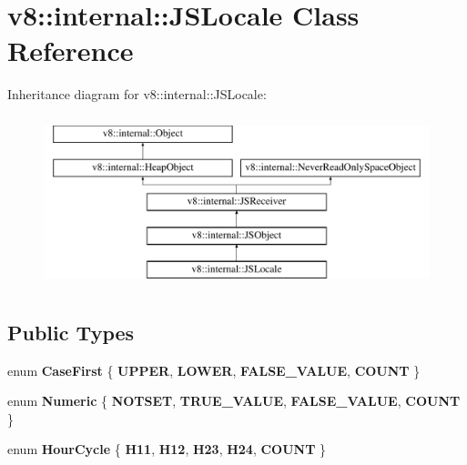 \hypertarget{classv8_1_1internal_1_1JSLocale}{}\section{v8\+:\+:internal\+:\+:J\+S\+Locale Class Reference}
\label{classv8_1_1internal_1_1JSLocale}
Inheritance diagram for v8\+:\+:internal\+:\+:J\+S\+Locale\+:\begin{figure}[H]
\begin{center}
\leavevmode
\includegraphics[height=5.000000cm]{classv8_1_1internal_1_1JSLocale}
\end{center}
\end{figure}
\subsection*{Public Types}
\begin{DoxyCompactItemize}
\item 
\mbox{\label{classv8_1_1internal_1_1JSLocale_a16663a288c5a2192068cf25bf79f358c}} 
enum {\bfseries Case\+First} \{ {\bfseries U\+P\+P\+ER}, 
{\bfseries L\+O\+W\+ER}, 
{\bfseries F\+A\+L\+S\+E\+\_\+\+V\+A\+L\+UE}, 
{\bfseries C\+O\+U\+NT}
 \}
\item 
\mbox{\label{classv8_1_1internal_1_1JSLocale_ab7b92dc327d348bee75ffeb7634b164b}} 
enum {\bfseries Numeric} \{ {\bfseries N\+O\+T\+S\+ET}, 
{\bfseries T\+R\+U\+E\+\_\+\+V\+A\+L\+UE}, 
{\bfseries F\+A\+L\+S\+E\+\_\+\+V\+A\+L\+UE}, 
{\bfseries C\+O\+U\+NT}
 \}
\item 
\mbox{\label{classv8_1_1internal_1_1JSLocale_a45eedf3d3a52118875c2b0b63b41db36}} 
enum {\bfseries Hour\+Cycle} \{ \newline
{\bfseries H11}, 
{\bfseries H12}, 
{\bfseries H23}, 
{\bfseries H24}, 
\newline
{\bfseries C\+O\+U\+NT}
 \}
\end{DoxyCompactItemize}
